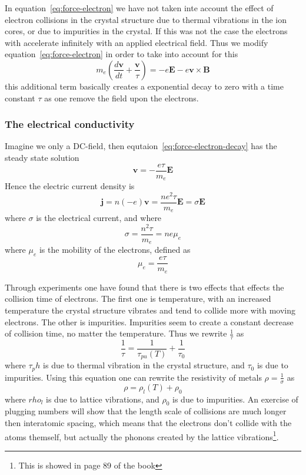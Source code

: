 \documentclass[11pt]{article}
\begin{document}
In equation~\ref{eq:force-electron} we have not taken inte account the effect of electron collisions in the crystal structure due to thermal vibrations in the ion cores, or due to impurities in the crystal. If this was not the case the electrons with accelerate infinitely with an applied electrical field. Thus we modify equation~\ref{eq:force-electron} in order to take into account for this
\begin{equation}
	m_e (\frac{d\pmb{v}}{dt} + \frac{\pmb{v}}{\tau} )= - e\pmb{E} - e\pmb{v} \times \pmb{B}
	\label{eq:force-electron-decay}
\end{equation}
this additional term basically creates a exponential decay to zero with a time constant $\tau$ as one remove the field upon the electrons.

\subsubsection{The electrical conductivity}
Imagine we only a DC-field, then equtaion~\ref{eq:force-electron-decay} has the steady state solution
\begin{equation}
	\pmb{v} = -\frac{e\tau}{m_e}\pmb{E}
\end{equation}
Hence the electric current density is 
\begin{equation}
	\pmb{j} = n(-e)\pmb{v} = \frac{ne^2\tau}{m_e} \pmb{E} = \sigma \pmb{E}
\end{equation}
where $\sigma$ is the electrical current, and where
\begin{equation}
	\sigma = \frac{n^2\tau}{m_e} = ne\mu_e
	\label{eq:sigma}
\end{equation}
where $\mu_e$ is the mobility of the electrons, defined as
\begin{equation}
	\mu_e = \frac{e\tau}{m_e}
\end{equation}

Through experiments one have found that there is two effects that effects the collision time of electrons. The first one is temperature, with an increased temperature the crystal structure vibrates and tend to collide more with moving electrons. The other is impurities. Impurities seem to create a constant decrease of collision time, no matter the temperature. Thus we rewrite $\frac{1}{\tau}$ as
\begin{equation}
	\frac{1}{\tau} = \frac{1}{\tau_{pu}(T)} + \frac{1}{\tau_0}
\end{equation}
where $\tau_ph$ is due to thermal vibration in the crystal structure, and $\tau_0$ is due to impurities. Using this equation one can rewrite the resistivity of metals $\rho = \frac{1}{\sigma}$ as
\begin{equation}
	\rho = \rho_l(T) + \rho_0
\end{equation}
where $rho_l$ is due to lattice vibrations, and $\rho_0$ is due to impurities. An exercise of plugging numbers will show that the length scale of collisions are much longer then interatomic spacing, which means that the electrons don't collide with the atoms themself, but actually the phonons created by the lattice vibrations\footnote{This is showed in page 89 of the book}.
\end{document}
